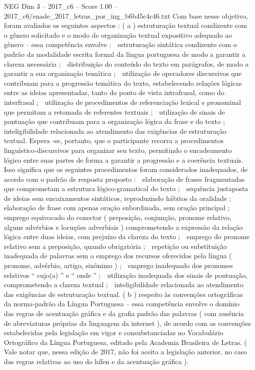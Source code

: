 \begin{textsample}{NEG Dim 3 – 2017\_c6 – Score 1.00 – 2017\_c6/enade\_2017\_letras\_por\_ing\_b6b45c4c46.txt}
Com base nesse objetivo, foram avaliados os seguintes aspectos : ( a ) estruturação textual condizente com o gênero solicitado e o modo de organização textual expositivo adequado ao gênero – essa competência envolve :  estruturação sintática condizente com o padrão da modalidade escrita formal da língua portuguesa de modo a garantir a clareza necessária ;  distribuição do conteúdo do texto em parágrafos, de modo a garantir a sua organização temática ;  utilização de operadores discursivos que contribuam para a progressão temática do texto, estabelecendo relações lógicas entre as ideias apresentadas, tanto do ponto de vista intrafrasal, como do interfrasal ;  utilização de procedimentos de referenciação lexical e pronominal que permitam a retomada de referentes textuais ;  utilização de sinais de pontuação que contribuam para a organização lógica da frase e do texto ;  inteligibilidade relacionada ao atendimento das exigências de estruturação textual.
Espera -se, portanto, que o participante recorra a procedimentos linguístico-discursivos para organizar seu texto, permitindo o encadeamento lógico entre suas partes de forma a garantir a progressão e a coerência textuais.
Isso significa que os seguintes procedimentos foram considerados inadequados, de acordo com o padrão de resposta proposto :  elaboração de frases fragmentadas que comprometam a estrutura lógico-gramatical do texto ;  sequência justaposta de ideias sem encaixamentos sintáticos, reproduzindo hábitos da oralidade ;  elaboração de frase com apenas oração subordinada, sem oração principal ;  emprego equivocado do conector ( preposição, conjunção, pronome relativo, alguns advérbios e locuções adverbiais ) comprometendo a expressão da relação lógica entre duas ideias, com prejuízo da clareza do texto ;  emprego do pronome relativo sem a preposição, quando obrigatória ;  repetição ou substituição inadequada de palavras sem o emprego dos recursos oferecidos pela língua ( pronome, advérbio, artigo, sinônimo ) ;  emprego inadequado dos pronomes relativos “ cujo(a) ” e “ onde ” ;  utilização inadequada dos sinais de pontuação, comprometendo a clareza textual ;  inteligibilidade relacionada ao atendimento das exigências de estruturação textual. ( b ) respeito às convenções ortográficas da norma-padrão da Língua Portuguesa – essa competência envolve o domínio das regras de acentuação gráfica e da grafia padrão das palavras ( com ausência de abreviaturas próprias da linguagem da internet ), de acordo com as convenções estabelecidas pela legislação em vigor e consubstanciadas no Vocabulário Ortográfico da Língua Portuguesa, editado pela Academia Brasileira de Letras. ( Vale notar que, nessa edição de 2017, não foi aceita a legislação anterior, no caso das regras relativas ao uso do hífen e da acentuação gráfica ).

\end{textsample}
